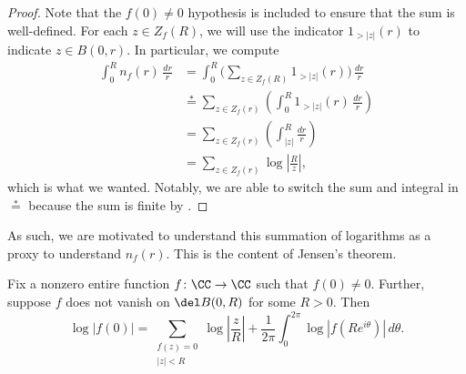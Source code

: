 \documentclass[notes.tex]{subfiles}
\begin{document}
\begin{proof}
	Note that the $f(0)\ne0$ hypothesis is included to ensure that the sum is well-defined. For each $z\in Z_f(R)$, we will use the indicator $1_{>|z|}(r)$ to indicate $z\in B(0,r)$. In particular, we compute
	\begin{align*}
		\int_0^Rn_f(r)\,\frac{dr}r &= \int_0^R\Bigg(\sum_{z\in Z_f(R)}1_{>|z|}(r)\Bigg)\,\frac{dr}r \\
		&\stackrel*= \sum_{z\in Z_f(r)}\left(\int_0^R1_{>|z|}(r)\,\frac{dr}r\right) \\
		&= \sum_{z\in Z_f(r)}\left(\int_{|z|}^R\frac{dr}r\right) \\
		&= \sum_{z\in Z_f(r)}\log\left|\frac Rz\right|,
	\end{align*}
	which is what we wanted. Notably, we are able to switch the sum and integral in $\stackrel*=$ because the sum is finite by .
\end{proof}
As such, we are motivated to understand this summation of logarithms as a proxy to understand $n_f(r)$. This is the content of Jensen's theorem.
\begin{theorem}[Jensen] \label{thm:jensen}
	Fix a nonzero entire function $f\colon\CC\to\CC$ such that $f(0)\ne0$. Further, suppose $f$ does not vanish on $\del B(0,R)$ for some $R>0$. Then
	\[\log|f(0)|=\sum_{\substack{f(z)=0\\|z|<R}}\log\left|\frac zR\right|+\frac1{2\pi}\int_0^{2\pi}\log\left|f\left(Re^{i\theta}\right)\right|\,d\theta.\]
\end{theorem}
\end{document}
